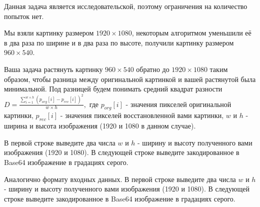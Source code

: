 
Данная задача является исследовательской, поэтому ограничения на количество попыток нет.

Мы взяли картинку размером $1920\times1080$, некоторым алгоритмом уменьшили её в два раза по ширине 
и в два раза по высоте, получили картинку размером $ 960\times540 $. 

Ваша задача растянуть картинку $ 960\times540 $ обратно до $ 1920\times1080 $ таким образом, 
чтобы разница между оригинальной картинкой и вашей растянутой была минимальной. Под разницей 
будем понимать средний квадрат разности $ D=\frac{\sum\limits_{i=1}^{w\times h} (p_{org}[i] - p_{rec}[i])^2}{w\times h},$ 
где $ p_{org}[i]$ - значения пикселей оригинальной картинки, $  p_{rec}[i] $ - значения пикселей восстановленной вами картинки, $ w $ и $ h $
- ширина и высота изображения (1920 и 1080 в данном случае).


В первой строке выведите два числа $ w $ и $ h $ - ширину и высоту полученного вами изображения 
(1920 и 1080). В следующей строке выведите закодированное в Base64 изображение в градациях серого.

\outputfmtSection

Аналогично формату входных данных. В первой строке выведите два числа $ w $ и $ h $ - ширину и высоту 
полученного вами изображения (1920 и 1080). В следующей строке выведите закодированное в 
Base64 изображение в градациях серого.

